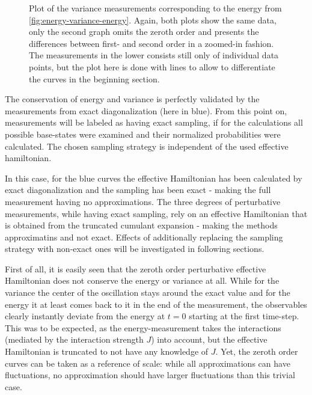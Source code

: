 \begin{figure}[htbp]
    \centering
    \caption{
            Plot of the variance measurements corresponding to the energy from \autoref{fig:energy-variance-energy}.
            Again, both plots show the same data, only the second graph omits the zeroth order and presents the differences between first- and second order in a zoomed-in fashion.
            The measurements in the lower consists still only of individual data points, but the plot here is done with lines to allow to differentiate the curves in the beginning section.
        }
    \label{fig:energy-variance-variance}
\end{figure}

The conservation of energy and variance is perfectly validated by the measurements from exact diagonalization (here in blue).
From this point on, measurements will be labeled as having \glqq exact sampling\grqq, if for the calculations all possible base-states were examined and their normalized probabilities were calculated.
The chosen sampling strategy is independent of the used effective hamiltonian. 

In this case, for the blue curves the effective Hamiltonian has been calculated by exact diagonalization and the sampling has been exact - making the full measurement having no approximations.
The three degrees of perturbative measurements, while having exact sampling, rely on an effective Hamiltonian that is obtained from the truncated cumulant expansion - making the methods approximatins and not exact.
Effects of additionally replacing the sampling strategy with non-exact ones will be investigated in following sections.

First of all, it is easily seen that the zeroth order perturbative effective Hamiltonian does not conserve the energy or variance at all.
While for the variance the center of the oscillation stays around the exact value and for the energy it at least comes back to it in the end of the measurement, the observables clearly instantly deviate from the energy at $t=0$ starting at the first time-step.
This was to be expected, as the energy-measurement takes the interactions (mediated by the interaction strength $J$) into account, but the effective Hamiltonian is truncated to not have any knowledge of $J$.
Yet, the zeroth order curves can be taken as a reference of scale: while all approximations can have fluctuations, no approximation should have larger fluctuations than this trivial case.

